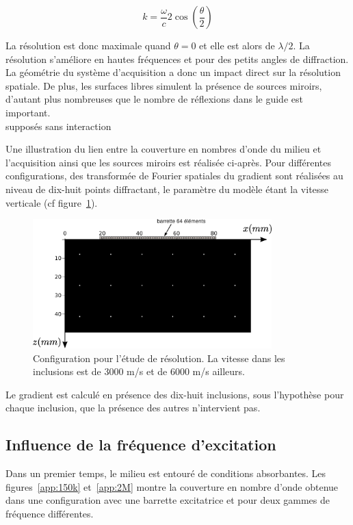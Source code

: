 \begin{equation}
	k= \frac{\omega}{c} 2 \cos\left( \frac{\theta}{2}\right)
\end{equation}

La résolution est donc maximale quand $\theta=0$ et elle est alors de $\lambda/2$. La résolution s'améliore en hautes fréquences et pour des petits angles de diffraction. La géométrie du système d'acquisition a donc un impact direct sur la résolution spatiale. De plus, les surfaces libres simulent la présence de sources miroirs, d'autant plus nombreuses que le nombre de réflexions dans le guide est important. \\


supposés sans interaction

Une illustration du lien entre la couverture en nombres d'onde du milieu et l'acquisition ainsi que les sources miroirs est réalisée ci-après. Pour différentes configurations, des transformée de Fourier spatiales du gradient sont réalisées au niveau de dix-huit points diffractant, le paramètre du modèle étant la vitesse verticale (cf figure~\ref{app:config_reso}).

\begin{figure}
	\centering
	\includegraphics[height=5cm]{img/vp_scat.png}
	\caption{Configuration pour l'étude de résolution. La vitesse dans les inclusions est de 3000 m/s et de 6000 m/s ailleurs. \label{app:config_reso}}
\end{figure}

Le gradient est calculé en présence des dix-huit inclusions, sous l'hypothèse pour chaque inclusion, que la présence des autres n'intervient pas.

\subsection{Influence de la fréquence d'excitation}

Dans un premier temps, le milieu est entouré de conditions absorbantes. Les figures~\ref{app:150k} et~\ref{app:2M} montre la couverture en nombre d'onde obtenue dans une configuration avec une barrette excitatrice et pour deux gammes de fréquence différentes. 
    
